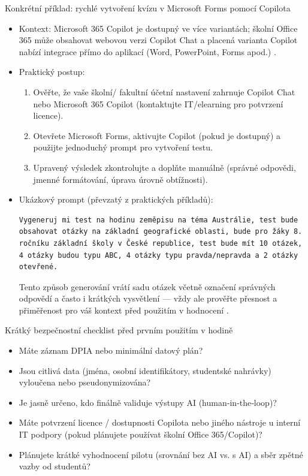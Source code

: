 Konkrétní příklad: rychlé vytvoření kvízu v Microsoft Forms pomocí Copilota
\begin{itemize}
  \item Kontext: Microsoft 365 Copilot je dostupný ve více variantách; školní Office 365 může obsahovat webovou verzi Copilot Chat a placená varianta Copilot nabízí integrace přímo do aplikací (Word, PowerPoint, Forms apod.) \cite{kb_ai_101_tipu_pdf_04e4a115_page_3_1}.
  \item Praktický postup:
    \begin{enumerate}
      \item Ověřte, že vaše školní/ fakultní účetní nastavení zahrnuje Copilot Chat nebo Microsoft 365 Copilot (kontaktujte IT/elearning pro potvrzení licence).
      \item Otevřete Microsoft Forms, aktivujte Copilot (pokud je dostupný) a použijte jednoduchý prompt pro vytvoření testu.
      \item Upravený výsledek zkontrolujte a doplňte manuálně (správné odpovědi, jmenné formátování, úprava úrovně obtížnosti).
    \end{enumerate}
  \item Ukázkový prompt (převzatý z praktických příkladů): 
\begin{verbatim}
Vygeneruj mi test na hodinu zeměpisu na téma Austrálie, test bude obsahovat otázky na základní geografické oblasti, bude pro žáky 8. ročníku základní školy v České republice, test bude mít 10 otázek, 4 otázky budou typu ABC, 4 otázky typu pravda/nepravda a 2 otázky otevřené.
\end{verbatim}
Tento způsob generování vrátí sadu otázek včetně označení správných odpovědí a často i krátkých vysvětlení — vždy ale prověřte přesnost a přiměřenost pro váš kontext před použitím v hodnocení \cite{kb_ai_101_tipu_pdf_04e4a115_page_36_1}.
\end{itemize}

Krátký bezpečnostní checklist před prvním použitím v hodině
\begin{itemize}
  \item Máte záznam DPIA nebo minimální datový plán? \cite{kb_malinka_chatgpt_ve_vyuce_dva_roky_pote_2024_pdf_90bc3aaf_page_12_1}
  \item Jsou citlivá data (jména, osobní identifikátory, studentské nahrávky) vyloučena nebo pseudonymizována? \cite{kb_malinka_chatgpt_ve_vyuce_dva_roky_pote_2024_pdf_90bc3aaf_page_12_1}
  \item Je jasně určeno, kdo finálně validuje výstupy AI (human‑in‑the‑loop)? \cite{kb_malinka_chatgpt_ve_vyuce_dva_roky_pote_2024_pdf_90bc3aaf_page_12_1}
  \item Máte potvrzení licence / dostupnosti Copilota nebo jiného nástroje u interní IT podpory (pokud plánujete používat školní Office 365/Copilot)? \cite{kb_ai_101_tipu_pdf_04e4a115_page_3_1}
  \item Plánujete krátké vyhodnocení pilotu (srovnání bez AI vs. s AI) a sběr zpětné vazby od studentů?
\end{itemize}

